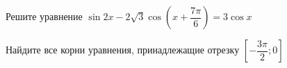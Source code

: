 \begin{ex}
	\begin{condition}
		\begin{enumcols}[label=\asbuk*)]
			\item Решите уравнение \( \sin 2x-2\sqrt{3} \cos{\left( x +  \dfrac{7\pi}{6} \right)}= 3\cos x  \)
			\item Найдите все корни уравнения, принадлежащие отрезку \( \left[-\dfrac{3\pi}{2};0\right] \)
		\end{enumcols}
	\end{condition}
\end{ex}